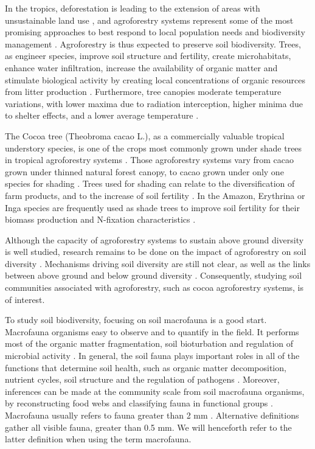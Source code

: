 \documentclass[fleqn,10pt]{ArtEcoFoG} %
\begin{document}
In the tropics, deforestation is leading to the extension of areas with unsustainable land use \citep{lamb_restoration_2005}, and agroforestry systems represent some of the most promising approaches to best respond to local population needs and biodiversity management \citep{bhagwat_agroforestry_2008, decaens_biodiversity_2018, gardner_prospects_2009, garrity_agroforestry_2004}. Agroforestry is thus expected to preserve soil biodiversity. Trees, as engineer species, improve soil structure and fertility, create microhabitats, enhance water infiltration, increase the availability of organic matter and stimulate biological activity by creating local concentrations of organic resources from litter production \citep{marsden_how_2020, udawatta_agroforestry_2019}. Furthermore, tree canopies moderate temperature variations, with lower maxima due to radiation interception, higher minima due to shelter effects, and a lower average temperature \citep{CHEN199999}.

The Cocoa tree (Theobroma cacao L.), as a commercially valuable tropical understory species, is one of the crops most commonly grown under shade trees in tropical agroforestry systems \citep{franzen_ecological_2007}. Those agroforestry systems vary from cacao grown under thinned natural forest canopy, to cacao grown under only one species for shading \citep{moco_relationships_2010}. Trees used for shading can relate to the diversification of farm products, and to the increase of soil fertility \citep{sauvadet_shade_2019}. In the Amazon, Erythrina or Inga species are frequently used as shade trees to improve soil fertility for their biomass production and N-fixation characteristics \citep{lojka_biomass_2005}.

Although the capacity of agroforestry systems to sustain above ground diversity is well studied, research remains to be done on the impact of agroforestry on soil diversity \citep{marsden_how_2020, moco_relationships_2010}. Mechanisms driving soil diversity are still not clear, as well as the links between above ground and below ground diversity \citep{marsden_how_2020, moco_relationships_2010}. Consequently, studying soil communities associated with agroforestry, such as cocoa agroforestry systems, is of interest.

To study soil biodiversity, focusing on soil macrofauna is a good start. Macrofauna organisms easy to observe and to quantify in the field. It performs most of the organic matter fragmentation, soil bioturbation and regulation of microbial activity \citep{lavelle_soil_2006, potapov_feeding_2022}. In general, the soil fauna plays important roles in all of the functions that determine soil health, such as organic matter decomposition, nutrient cycles, soil structure and the regulation of pathogens \citep{kibblewhite_soil_2008}. Moreover, inferences can be made at the community scale from soil macrofauna organisms, by reconstructing food webs and classifying fauna in functional groups \citep{potapov_feeding_2022}. Macrofauna usually refers to fauna greater than 2 mm \citep{decaens_macroecological_2010}. Alternative definitions gather all visible fauna, greater than 0.5 mm. We will henceforth refer to the latter definition when using the term macrofauna.
\end{document}
